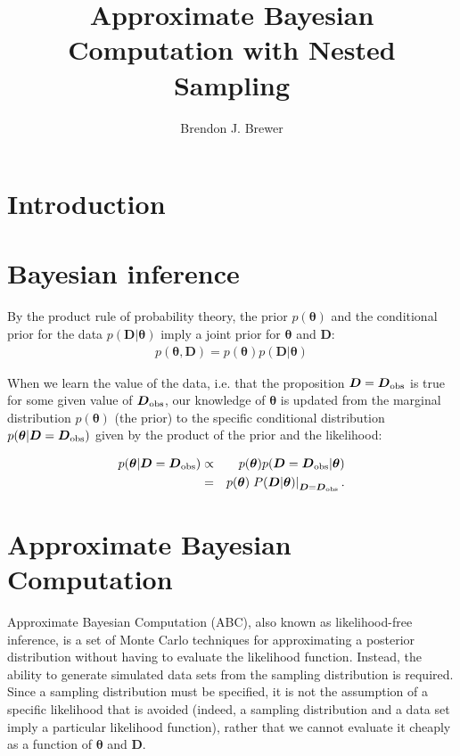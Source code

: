 \documentclass[a4paper, 11pt]{article}
\title{Approximate Bayesian Computation with Nested Sampling}
\author{Brendon J. Brewer}
\newcommand{\params}{\boldsymbol{\theta}}	%
\newcommand{\data}{\boldsymbol{D}}  %
\newcommand{\dobs}{\boldsymbol{D}_{\rm obs}} %
\begin{document}
\maketitle

\section{Introduction}


\section{Bayesian inference}
By the product rule of probability theory, the prior $p(\params)$ and the
conditional prior for the data $p(\data | \params)$ imply a joint prior
for $\params$ and $\data$:
\begin{equation}
\begin{array}{lr}
p(\params, \data) = p(\params)p(\data|\params)
\end{array}
\end{equation}

When we learn the value of the data, i.e. that the proposition
$\data = \dobs$ is true for some given value of $\dobs$, our knowledge of
$\params$ is updated from the marginal distribution $p(\params)$ (the prior)
to the specific conditional distribution $p(\params | \data=\dobs)$ given by
the product of the prior and the likelihood:

\begin{eqnarray}
p(\params | \data=\dobs) &\propto& p(\params)p(\data=\dobs | \params)\\
&=& p(\params)\left.P(\data | \params)\right|_{\data=\dobs}.
\end{eqnarray}

\section{Approximate Bayesian Computation}
Approximate Bayesian Computation (ABC), also known as likelihood-free inference,
is a set of Monte Carlo techniques for approximating a posterior distribution
without having to evaluate the likelihood function. Instead, the ability to
generate simulated data sets from the sampling distribution is required.
Since a sampling distribution must be specified, it is not the assumption of
a specific likelihood that is avoided (indeed, a sampling distribution and
a data set imply a particular likelihood function), rather that we cannot
evaluate it cheaply as a function of $\params$ and $\data$.
\end{document}
